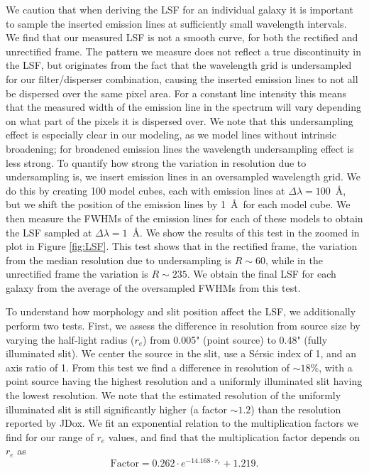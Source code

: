 \documentclass[twocolumn, astrosymb]{aastex631}
\begin{document}
We caution that when deriving the LSF for an individual galaxy it is important to sample the inserted emission lines at sufficiently small wavelength intervals. We find that our measured LSF is not a smooth curve, for both the rectified and unrectified frame. The pattern we measure does not reflect a true discontinuity in the LSF, but originates from the fact that the wavelength grid is undersampled for our filter/disperser combination, causing the inserted emission lines to not all be dispersed over the same pixel area. For a constant line intensity this means that the measured width of the emission line in the spectrum will vary depending on what part of the pixels it is dispersed over. We note that this undersampling effect is especially clear in our modeling, as we model lines without intrinsic broadening; for broadened emission lines the wavelength undersampling effect is less strong. To quantify how strong the variation in resolution due to undersampling is, we insert emission lines in an oversampled wavelength grid. We do this by creating 100 model cubes, each with emission lines at $\Delta \lambda = 100$~\AA, but we shift the position of the emission lines by 1~\AA\ for each model cube. We then measure the FWHMs of the emission lines for each of these models to obtain the LSF sampled at $\Delta \lambda = 1$~\AA. We show the results of this test in the zoomed in plot in Figure \ref{fig:LSF}. This test shows that in the rectified frame, the variation from the median resolution due to undersampling is $R\sim60$, while in the unrectified frame the variation is $R\sim235$. We obtain the final LSF for each galaxy from the average of the oversampled FWHMs from this test.

To understand how morphology and slit position affect the LSF, we additionally perform two tests. First, we assess the difference in resolution from source size by varying the half-light radius ($r_e$) from 0.005" (point source) to 0.48" (fully illuminated slit). We center the source in the slit, use a S\'ersic index of 1, and an axis ratio of 1. From this test we find a difference in resolution of $\sim18\%$, with a point source having the highest resolution and a uniformly illuminated slit having the lowest resolution. We note that the estimated resolution of the uniformly illuminated slit is still significantly higher (a factor $\sim1.2$) than the resolution reported by JDox. We fit an exponential relation to the multiplication factors we find for our range of $r_e$ values, and find that the multiplication factor depends on $r_e$ as
\begin{equation}
    \text{Factor} = 0.262 \cdot e^{-14.168 \cdot r_e} + 1.219.
\end{equation}
\end{document}
